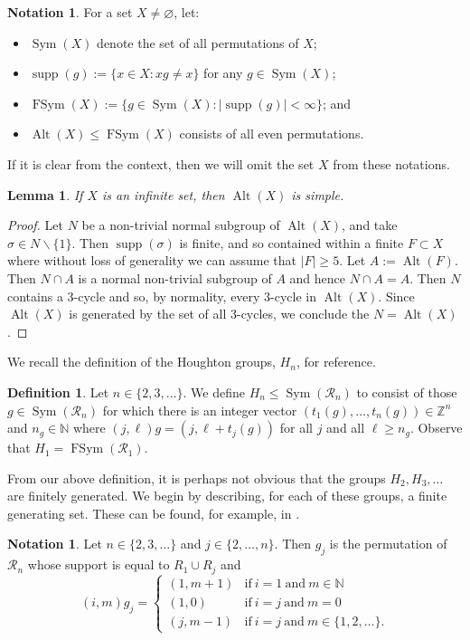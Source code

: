 \documentclass[11pt,a4paper]{amsart}
\renewcommand{\setminus}{\smallsetminus}
\renewcommand{\emptyset}{\varnothing}
\newtheorem{lemma}[theorem]{Lemma}
\theoremstyle{definition}
\newtheorem{definition}[theorem]{Definition}
\newtheorem{notation}[theorem]{Notation}
\theoremstyle{remark}
\newcommand{\supp}{\operatorname{supp}}
\newcommand{\Sym}{\operatorname{Sym}}
\newcommand{\FSym}{\operatorname{FSym}}
\newcommand{\Alt}{\operatorname{Alt}}
\newcommand{\Z}{\mathbb Z}
\newcommand{\N}{\mathbb N}
\newcommand{\Ra}{\mathcal{R}}
\begin{document}
\begin{notation} For a set $X\ne \emptyset$, let:
\begin{itemize}
\item $\Sym(X)$ denote the set of all permutations of $X$;
\item $\supp(g):=\{x\in X : xg\ne x\}$ for any $g\in\Sym(X)$;
\item $\FSym(X):=\{g\in \Sym(X) : |\supp(g)|<\infty\}$; and
\item $\Alt(X)\le \FSym(X)$ consists of all even permutations.
\end{itemize}
If it is clear from the context, then we will omit the set $X$ from these notations.
\end{notation}
\begin{lemma}\label{lem:AltisSimple}
If $X$ is an infinite set, then $\Alt(X)$ is simple.
\end{lemma}
\begin{proof} Let $N$ be a non-trivial normal subgroup of $\Alt(X)$, and take $\sigma\in N\setminus\{1\}$. Then $\supp(\sigma)$ is finite, and so contained within a finite $F\subset X$ where without loss of generality we can assume that $|F|\ge 5$. Let $A:=\Alt(F)$. Then $N\cap A$ is a normal non-trivial subgroup of $A$ and hence $N\cap A=A$. Then $N$ contains a 3-cycle and so, by normality, every 3-cycle in $\Alt(X)$. Since $\Alt(X)$ is generated by the set of all 3-cycles, we conclude the $N=\Alt(X)$.
\end{proof}
We recall the definition of the Houghton groups, $H_n$, for reference.
\begin{definition} Let $n\in \{2, 3, \ldots\}$. We define $H_n\le \Sym(\Ra_n)$ to consist of those $g\in \Sym(\Ra_n)$ for which there is an integer vector $(t_1(g),\ldots, t_n(g))\in\Z^n$ and $n_g\in \N$ where $(j,\ell)g=(j,\ell+t_j(g))$ for all $j$ and all $\ell\ge n_g$. Observe that $H_1=\FSym(\Ra_1)$.
\end{definition}

From our above definition, it is perhaps not obvious that the groups $H_2, H_3, \ldots$ are finitely generated. We begin by describing, for each of these groups, a finite generating set. These can be found, for example, in \cite{MR3078485}.

\begin{notation}\label{not:permsgj}
Let $n\in\{2, 3, \ldots\}$ and $j\in\{2, \ldots, n\}$. Then $g_j$ is the permutation of $\Ra_n$ whose support is equal to $R_1\cup R_j$ and
\begin{equation*}
(i,m)g_j=\left\{\begin{array}{ll}(1, m+1) & \mathrm{if}\ i=1\ \mathrm{and}\ m\in\N\\ (1,0) & \mathrm{if}\ i=j\ \mathrm{and}\ m=0\\ (j, m-1) & \mathrm{if}\ i=j\ \mathrm{and}\ m\in\{1, 2, \ldots\}.
\end{array}\right.
\end{equation*}
\end{notation}
\end{document}
